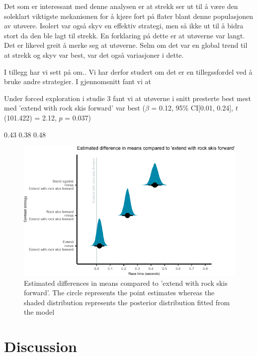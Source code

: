 \documentclass[letterpaper,10pt]{article}
\begin{document}
Det som er interessant med denne analysen er at strekk ser ut til å være den soleklart viktigste mekanismen for å kjøre fort på flater blant denne populasjonen av utøvere. Isolert var også skyv en effektiv strategi, men så ikke ut til å bidra stort da den ble lagt til strekk. En forklaring på dette er at utøverne var langt. Det er likevel greit å merke seg at utøverne. Selm om det var en global trend til at strekk og skyv var best, var det også variasjoner i dette. 

I tillegg har vi sett på om.. Vi har derfor studert om det er en tillegssfordel ved å bruke andre strategier. I gjennomsnitt fant vi at 



Under forced exploration i studie 3 fant vi at utøverne i snitt presterte best mest med 'extend with rock skis forward' var best  ($\beta$ = 0.12, 95\% CI[0.01, 0.24], $t$(101.422) = 2.12, $p$ = 0.037)

0.43   0.38   0.48 






\begin{figure}[H]
\centering
\includegraphics{figure_results_Q1_strategies.pdf}
\caption{Estimated differences in means compared to 'extend with rock skis forward'. The circle represents the point estimates whereas the shaded distribution represents the posterior distribution fitted from the model}
\label{fig:experiment}
\end{figure}



\section{Discussion}

\section{}

\printbibliography
\end{document}
